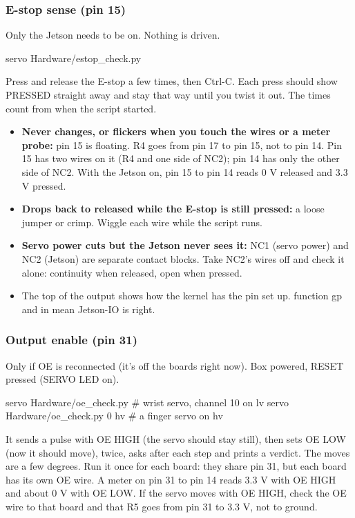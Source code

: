 \documentclass[11pt,letterpaper]{article}
\newcommand{\code}[1]{\textcolor{codeblue}{\ttfamily\smaller\relax #1}}
\begin{document}
\subsubsection*{E-stop sense (pin 15)}
Only the Jetson needs to be on. Nothing is driven.
\begin{codeblock}
servo Hardware/estop_check.py
\end{codeblock}
Press and release the E-stop a few times, then Ctrl-C. Each press should show PRESSED straight away and stay that way until you twist it out. The times count from when the script started.
\begin{itemize}
  \item \textbf{Never changes, or flickers when you touch the wires or a meter probe:} pin 15 is floating. R4 goes from pin 17 to pin 15, not to pin 14. Pin 15 has two wires on it (R4 and one side of NC2); pin 14 has only the other side of NC2. With the Jetson on, pin 15 to pin 14 reads 0 V released and 3.3 V pressed.
  \item \textbf{Drops back to released while the E-stop is still pressed:} a loose jumper or crimp. Wiggle each wire while the script runs.
  \item \textbf{Servo power cuts but the Jetson never sees it:} NC1 (servo power) and NC2 (Jetson) are separate contact blocks. Take NC2's wires off and check it alone: continuity when released, open when pressed.
  \item The top of the output shows how the kernel has the pin set up. \code{function gp} and \code{in} mean Jetson-IO is right.
\end{itemize}

\subsubsection*{Output enable (pin 31)}
Only if OE is reconnected (it's off the boards right now). Box powered, RESET pressed (SERVO LED on).
\begin{codeblock}
servo Hardware/oe_check.py            # wrist servo, channel 10 on lv
servo Hardware/oe_check.py 0 hv       # a finger servo on hv
\end{codeblock}
It sends a pulse with OE HIGH (the servo should stay still), then sets OE LOW (now it should move), twice, asks after each step and prints a verdict. The moves are a few degrees. Run it once for each board: they share pin 31, but each board has its own OE wire. A meter on pin 31 to pin 14 reads 3.3 V with OE HIGH and about 0 V with OE LOW. If the servo moves with OE HIGH, check the OE wire to that board and that R5 goes from pin 31 to 3.3 V, not to ground.
\end{document}
